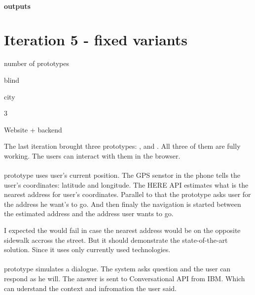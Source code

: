 	\paragraph{outputs}
	
	
	
	 
	\section{Iteration 5 - fixed variants}
	\begin{labeling}{number of prototypes}
		\item [people] blind
		\item [environment] city
		\item [number of prototypes] 3
		\item [implementation] Website + backend
	\end{labeling}

	The last iteration brought three prototypes: \reversegeo, \gps and \poi. All three of them are fully working. The users can interact with them in the browser.
		
	
	\paragraph{\reversegeo}
	\reversegeo prototype uses user's current position. The GPS senstor in the phone tells the user's coordinates: latitude and longitude. The HERE API \cite{here-api} estimates what is the nearest address for user's coordinates. Parallel to that the prototype asks user for the address he want's to go. And then finaly the navigation is started between the estimated address and the address user wants to go.
	
	
	I expected the \reversegeo would fail in case the nearest address would be on the opposite sidewalk accross the street. But it should demonstrate the state-of-the-art solution. Since it uses only currently used technologies. 
	
	
	\paragraph{\poi}
	\poi prototype simulates a dialogue. The system asks question and the user can respond as he will. The answer is sent to Conversational API\cite{conversational-api} from IBM. Which can uderstand the context and infromation the user said.
	
